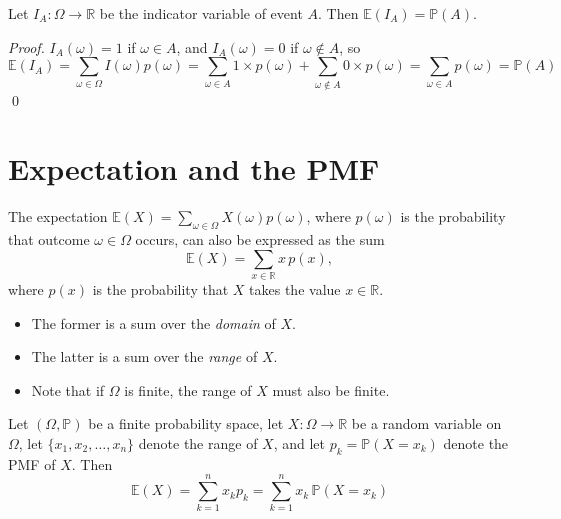 \documentclass[lecture]{csm}
\newcommand{\R}{\mathbb{R}}
\newcommand{\prob}{\mathbb{P}}
\newcommand{\expe}{\mathbb{E}}
\def\it{\item}
\def\bit{\begin{itemize}}
\def\eit{\end{itemize}}
\begin{document}
\begin{theorem}
Let $I_A:\Omega\to\R$ be the indicator variable of event $A$. Then $\expe(I_A) = \prob(A)$.
\end{theorem}
\begin{proof}
$I_A(\omega)=1$ if $\omega\in A$, and $I_A(\omega)=0$ if $\omega\notin A$, so
\[
\expe(I_A) 
	= \sum_{\omega\in\Omega} I(\omega)p(\omega) 
	= \sum_{\omega\in A} 1\times p(\omega) + \sum_{\omega\notin A} 0\times p(\omega) 
	= \sum_{\omega\in A} p(\omega) 
	= \prob(A)
\]
\qed
\end{proof}

\section{Expectation and the PMF}
The expectation $\expe(X)=\sum_{\omega\in\Omega} X(\omega)p(\omega)$, where $p(\omega)$ is the probability that outcome $\omega\in\Omega$ occurs, can also be expressed as the sum 
\[
\expe(X) = \sum_{x\in\R} x\,p(x),
\] 
where $p(x)$ is the probability that $X$ takes the value $x\in\R$.

\bit
\it The former is a sum over the \emph{domain} of $X$. %
\it The latter is a sum over the \emph{range} of $X$. %
\it Note that if $\Omega$ is finite, the range of $X$ must also be finite.
\eit

\begin{theorem}
Let $(\Omega,\prob)$ be a finite probability space, let $X:\Omega\to\R$ be a random variable on $\Omega$, let $\{x_1,x_2,\ldots,x_n\}$ denote the range of $X$, and let $p_k =\prob(X=x_k)$ denote the PMF of $X$. Then
\[
\expe(X) = \sum_{k=1}^n x_k p_k = \sum_{k=1}^n x_k\,\prob(X=x_k) 
\]
\end{theorem}

\break %
\end{document}

